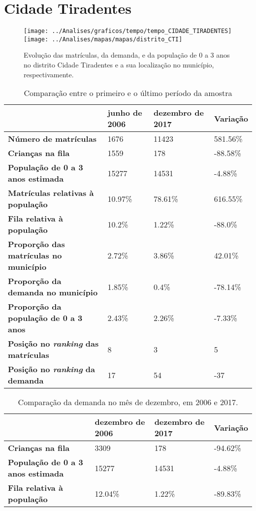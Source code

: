 \section{Cidade Tiradentes}
\begin{figure}[H]
	\centering
	\texttt{[image: ../Analises/graficos/tempo/tempo\_CIDADE\_TIRADENTES]}
	\texttt{[image: ../Analises/mapas/mapas/distrito\_CTI]}
	\caption{Evolução das matrículas, da demanda, e da população de 0 a 3 anos no distrito Cidade Tiradentes e a sua localização no município, respectivamente.}
\end{figure}
\begin{table}[H]
	\begin{tabular}{|l|l|l|l|}
		\hline
		\textbf{}                                      & \textbf{junho de 2006}       & \textbf{dezembro de 2017}    & \textbf{Variação} \\ \hline
		\textbf{Número de matrículas}                  & 1676 & 11423 & 581.56\% \\ \hline
		\textbf{Crianças na fila}                      & 1559 & 178 & -88.58\% \\ \hline
		\textbf{População de 0 a 3 anos estimada}      & 15277 & 14531 & -4.88\% \\ \hline
		\textbf{Matrículas relativas à população}      & 10.97\% & 78.61\% & 616.55\% \\ \hline
		\textbf{Fila relativa à população}             & 10.2\% & 1.22\% & -88.0\% \\ \hline
		\textbf{Proporção das matrículas no município} & 2.72\% & 3.86\% & 42.01\% \\ \hline
		\textbf{Proporção da demanda no município}     & 1.85\% & 0.4\% & -78.14\% \\ \hline
		\textbf{Proporção da população de 0 a 3 anos}  & 2.43\% & 2.26\% & -7.33\% \\ \hline
		\textbf{Posição no \textit{ranking} das matrículas}     & 8 & 3 & 5 \\ \hline
		\textbf{Posição no \textit{ranking} da demanda}         & 17 & 54 & -37 \\ \hline
	\end{tabular}
	\caption{Comparação entre o primeiro e o último período da amostra}
\end{table}
\begin{table}[H]
	\begin{tabular}{|l|l|l|l|}
		\hline
		\textbf{}                                 & \textbf{dezembro de 2006} & \textbf{dezembro de 2017} & \textbf{Variação} \\ \hline
		\textbf{Crianças na fila}                      & 3309 & 178 & -94.62\% \\ \hline
		\textbf{População de 0 a 3 anos estimada}      & 15277 & 14531 & -4.88\% \\ \hline
		\textbf{Fila relativa à população}             & 12.04\% & 1.22\% & -89.83\% \\ \hline
	\end{tabular}
	\caption{Comparação da demanda no mês de dezembro, em 2006 e 2017.}
\end{table}
